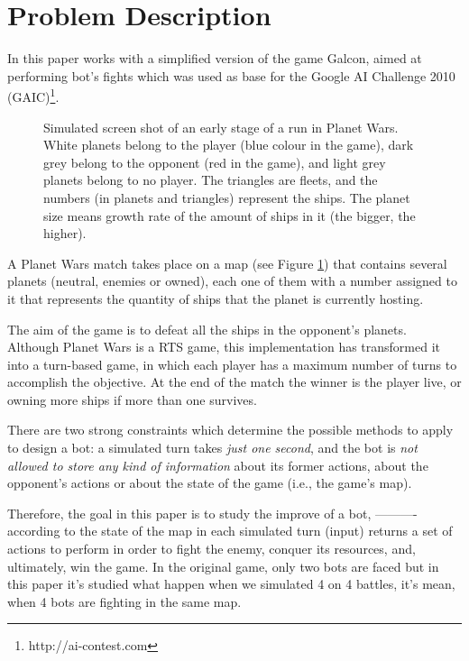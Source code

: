 \documentclass{llncs}
\begin{document}
\section{Problem Description}
\label{sec:problemDescription}

In this paper works with a simplified version of the game Galcon, aimed at performing bot's fights which was used as base for the Google AI Challenge 2010 (GAIC)\footnote{http://ai-contest.com}.

\begin{figure}[ht]
\tiny
\begin{center}
\end{center}
\caption{Simulated screen shot of an early stage of a run in Planet Wars. White planets belong to the player (blue colour in the game), dark grey belong to the opponent (red in the game), and light grey planets belong to no player. The triangles are fleets, and the numbers (in planets and triangles) represent the ships. The planet size means growth rate of the amount of ships in it (the bigger, the higher).}
\label{figura:PlanetWars1}
\end{figure}

A Planet Wars match takes place on a map (see Figure \ref{figura:PlanetWars1}) that contains several planets (neutral, enemies or owned), each one of them with a number assigned to it that represents the quantity of ships that the planet is currently hosting. 

The aim of the game is to defeat all the ships in the opponent's planets. Although Planet Wars is a RTS game, this implementation has transformed it into a turn-based game, in which each player has a maximum number of turns to accomplish the objective. At the end of the match the winner is the player live, or owning more ships if more than one survives. 

There are two strong constraints which determine the possible methods to apply to design
a bot: a simulated turn takes \textit{just one second}, and the bot is \textit{not allowed to store any kind of information} about its former actions, about the opponent's actions or about the state of the game (i.e., the game's map).

Therefore, the goal in this paper is to study the improve of a bot, ---------- according to the state of the map in each simulated turn (input) returns a set of actions to perform in order to fight the enemy, conquer its resources, and, ultimately, win the game. In the original game, only two bots are faced but in this paper it's studied what happen when we simulated 4 on 4 battles, it's mean, when 4 bots are fighting in the same map.
\end{document}
